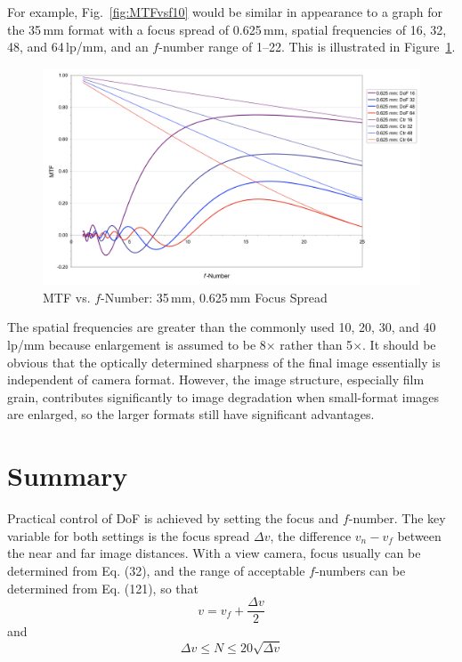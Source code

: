 \documentclass[11pt, oneside]{scrartcl}   	%
\newcommand{\Dv}{\ensuremath{\Delta v}}
\begin{document}
For example, Fig.~\ref{fig:MTFvsf10} would be similar in appearance to a graph for the 35\,mm format with a focus spread of 0.625\,mm, spatial frequencies of 16, 32, 48, and 64\,lp/mm, and an $f$-number range of 1--22. This is illustrated in Figure~\ref{fig:MTFvsf35}.

\begin{figure}[htbp] %
   \centering
   \includegraphics[width=\linewidth]{figure/fig_dofd_16} 
   \caption{MTF vs. $f$-Number: 35\,mm, 0.625\,mm Focus Spread}
   \label{fig:MTFvsf35}
\end{figure}

The spatial frequencies are greater than the commonly used 10, 20, 30, and 40\,lp/mm because enlargement is assumed to be 8$\times$ rather than 5$\times$.
It should be obvious that the optically determined sharpness of the final image essentially is independent of camera format. However, the image structure, especially film grain, contributes significantly to image degradation when small-format images are enlarged, so the larger formats still have significant advantages.

\section{Summary}

Practical control of DoF is achieved by setting the focus and $f$-number. The key variable for both settings is the focus spread $\Dv$, the difference $v_n - v_f$ between the near and far image distances. With a view camera, focus usually can be determined from Eq. (32), and the range of acceptable $f$-numbers can be determined from Eq. (121), so that
\begin{equation}
v = v_f +\frac{\Dv}2
\end{equation}
and
\begin{equation}
\Dv \leq N \leq 20\sqrt{\Dv}
\end{equation}
\end{document}
